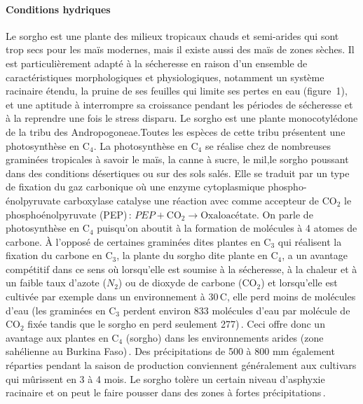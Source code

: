 \documentclass[a4paper,11pt]{article}
\begin{document}
\paragraph{Conditions hydriques} Le sorgho est une plante des milieux
tropicaux chauds et semi-arides qui sont trop secs pour les maïs
modernes, mais il existe aussi des maïs de zones sèches. Il est
particulièrement adapté à la sécheresse en raison d’un ensemble de
caractéristiques morphologiques et physiologiques, notamment un
système racinaire étendu, la pruine de ses feuilles qui limite ses
pertes en eau (figure~1), et une aptitude à interrompre sa croissance
pendant les périodes de sécheresse et à la reprendre une fois le
stress disparu. Le sorgho est une plante monocotylédone de la tribu
des Andropogoneae.Toutes les espèces de cette tribu présentent une
photosynthèse en $\text{C}_4$. La photosynthèse en $\text{C}_4$ se
réalise chez de nombreuses graminées tropicales à savoir le maïs, la
canne à sucre, le mil,le sorgho poussant dans des conditions
désertiques ou sur des sols salés. Elle se traduit par un type de
fixation du gaz carbonique où une enzyme cytoplasmique
phospho-énolpyruvate carboxylase catalyse une réaction avec comme
accepteur de $\text{CO}_2$ le phosphoénolpyruvate (PEP)\,:
$PEP + \text{CO}_2 \longrightarrow \text{Oxaloacétate}$. On parle de
photosynthèse en $\text{C}_4$ puisqu'on aboutit à la formation de
molécules à 4 atomes de carbone. À l’opposé de certaines graminées
dites plantes en $\text{C}_3$ qui réalisent la fixation du carbone en
$\text{C}_3$, la plante du sorgho dite plante en $\text{C}_4$, a un
avantage compétitif dans ce sens où lorsqu’elle est soumise à la
sécheresse, à la chaleur et à un faible taux d’azote ($N_2$) ou de
dioxyde de carbone ($\text{CO}_2$) et lorsqu’elle est cultivée par
exemple dans un environnement à 30\,\degree{}C, elle perd moins de
molécules d’eau (les graminées en $\text{C}_3$ perdent environ 833
molécules d’eau par molécule de $\text{CO}_2$ fixée tandis que le
sorgho en perd seulement 277)\,\cite{sage1998c4}. Ceci offre donc un
avantage aux plantes en $\text{C}_4$ (sorgho) dans les environnements
arides (zone sahélienne au Burkina Faso)\,\cite{sage1998c4}. Des
 précipitations de 500 à 800 mm également réparties pendant la saison
 de production conviennent généralement aux cultivars qui mûrissent
 en 3 à 4 mois. Le sorgho tolère un certain niveau d’asphyxie
 racinaire et on peut le faire pousser dans des zones à fortes
 précipitations\,\cite{BARRO_KONDOMBO_2010}.

 
\end{document}
